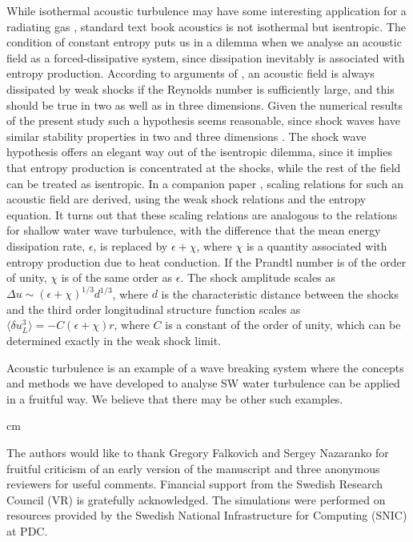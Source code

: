 While isothermal acoustic turbulence may have some interesting application for a radiating gas \cite[]{Stein1967}, standard text book acoustics is not isothermal but isentropic. The  condition of constant entropy puts us in a dilemma when we analyse an acoustic field as a forced-dissipative system, since dissipation inevitably is associated with entropy production.  According to arguments of \cite{KadomtsevPet1973}, an acoustic field is always dissipated by weak shocks if the Reynolds number is sufficiently large,  and this should be true in two as well as in three dimensions.  Given the numerical results of the present study such a hypothesis seems reasonable, since shock waves have similar stability properties 
in two and three dimensions \cite[]{ApazidisEliasson2018, LivertsApazidis2016}.  The shock wave hypothesis offers an elegant way out of the isentropic dilemma, since it implies that entropy production is concentrated at the shocks, while the rest of the field can be treated as isentropic. In a companion paper \cite[]{Lindborg2019}, scaling relations for such an acoustic field are derived, using the weak shock relations and the entropy equation. It turns out that these scaling relations are analogous to the relations for shallow water wave turbulence, with the  difference 
that the mean energy dissipation rate, $ \epsilon $, is replaced by $ \epsilon + \chi $, where $ \chi $ is a quantity associated with entropy production due to heat conduction. If  the Prandtl number is of the order of unity, $ \chi $ is of the same order as $ \epsilon $.  The shock amplitude scales as $ \Delta u \sim (\epsilon + \chi)^{1/3} d^{1/3} $, where $ d $ is the characteristic distance between the shocks and the third order longitudinal structure function scales as $ \langle \delta u_L^{3} \rangle = -C (\epsilon + \chi)r $, where $ C $ is a constant of the order of unity, which can be determined exactly in the weak shock limit. 

Acoustic turbulence is an example of a wave breaking system where the concepts and methods we have developed to analyse SW water turbulence can be applied in a fruitful way.  We believe that there may be other such examples.


 cm

\noindent The authors would like to thank Gregory Falkovich and Sergey Nazaranko for  fruitful criticism of an early version of the manuscript and three anonymous reviewers for useful comments. Financial
support from the Swedish Research Council (VR) is gratefully
acknowledged. The simulations were performed
on resources provided by the Swedish National Infrastructure
for Computing (SNIC) at PDC.



